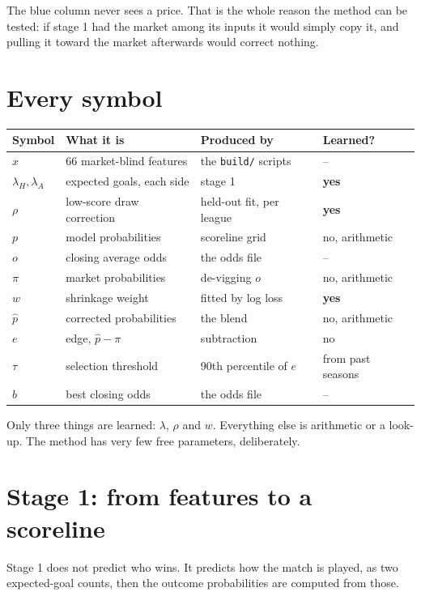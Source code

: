 \documentclass[11pt,a4paper]{article}
\begin{document}
The blue column never sees a price. That is the whole reason the method can be
tested: if stage 1 had the market among its inputs it would simply copy it, and
pulling it toward the market afterwards would correct nothing.

\section*{Every symbol}

\begin{center}
\begin{tabular}{@{}llll@{}}
\toprule
\textbf{Symbol} & \textbf{What it is} & \textbf{Produced by} & \textbf{Learned?}\\
\midrule
$x$ & 66 market-blind features & the \texttt{build/} scripts & --\\
$\lambda_H,\lambda_A$ & expected goals, each side & stage 1 & \textbf{yes}\\
$\rho$ & low-score draw correction & held-out fit, per league & \textbf{yes}\\
$p$ & model probabilities & scoreline grid & no, arithmetic\\
$o$ & closing average odds & the odds file & --\\
$\pi$ & market probabilities & de-vigging $o$ & no, arithmetic\\
$w$ & shrinkage weight & fitted by log loss & \textbf{yes}\\
$\hat p$ & corrected probabilities & the blend & no, arithmetic\\
$e$ & edge, $\hat p - \pi$ & subtraction & no\\
$\tau$ & selection threshold & 90th percentile of $e$ & from past seasons\\
$b$ & best closing odds & the odds file & --\\
\bottomrule
\end{tabular}
\end{center}

Only three things are learned: $\lambda$, $\rho$ and $w$. Everything else is
arithmetic or a look-up. The method has very few free parameters, deliberately.

\newpage
\section*{Stage 1: from features to a scoreline}

Stage 1 does not predict who wins. It predicts how the match is played, as two
expected-goal counts, then the outcome probabilities are computed from those.
\end{document}
